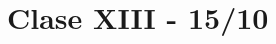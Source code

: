 \documentclass[12pt,a4paper]{book}
\author{Bustos Jordi\\
    \texttt{jordibustos01@gmail.com}
    }
\theoremstyle{definition}
\begin{document}
\chapter{Clase XIII - 15/10}
\end{document}
